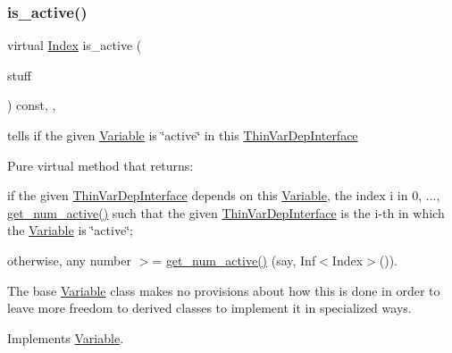 \subsubsection{\texorpdfstring{is\+\_\+active()}{is\_active()}}
{\footnotesize\ttfamily virtual \mbox{\hyperlink{class_s_m_spp__di__unipi__it_1_1_variable_ad53d6229d7ec28555a9c9c2fd9abf773}{Index}} is\+\_\+active (\begin{DoxyParamCaption}\item[{\mbox{\hyperlink{class_s_m_spp__di__unipi__it_1_1_thin_var_dep_interface}{Thin\+Var\+Dep\+Interface}} $\ast$}]{stuff }\end{DoxyParamCaption}) const\hspace{0.3cm}{\ttfamily [inline]}, {\ttfamily [override]}, {\ttfamily [virtual]}}



tells if the given \mbox{\hyperlink{class_s_m_spp__di__unipi__it_1_1_variable}{Variable}} is \char`\"{}active\char`\"{} in this \mbox{\hyperlink{class_s_m_spp__di__unipi__it_1_1_thin_var_dep_interface}{Thin\+Var\+Dep\+Interface}} 

Pure virtual method that returns\+:


\begin{DoxyItemize}
\item if the given \mbox{\hyperlink{class_s_m_spp__di__unipi__it_1_1_thin_var_dep_interface}{Thin\+Var\+Dep\+Interface}} depends on this \mbox{\hyperlink{class_s_m_spp__di__unipi__it_1_1_variable}{Variable}}, the index i in 0, ..., \mbox{\hyperlink{class_s_m_spp__di__unipi__it_1_1_col_variable_aad5c7fae8bf5c960045590272201d88e}{get\+\_\+num\+\_\+active()}} such that the given \mbox{\hyperlink{class_s_m_spp__di__unipi__it_1_1_thin_var_dep_interface}{Thin\+Var\+Dep\+Interface}} is the i-\/th in which the \mbox{\hyperlink{class_s_m_spp__di__unipi__it_1_1_variable}{Variable}} is \char`\"{}active\char`\"{};
\item otherwise, any number $>$= \mbox{\hyperlink{class_s_m_spp__di__unipi__it_1_1_col_variable_aad5c7fae8bf5c960045590272201d88e}{get\+\_\+num\+\_\+active()}} (say, Inf$<$\+Index$>$()).
\end{DoxyItemize}

The base \mbox{\hyperlink{class_s_m_spp__di__unipi__it_1_1_variable}{Variable}} class makes no provisions about how this is done in order to leave more freedom to derived classes to implement it in specialized ways. 

Implements \mbox{\hyperlink{class_s_m_spp__di__unipi__it_1_1_variable_a20d389d57c1714ae3c53978c3e6fa987}{Variable}}.

